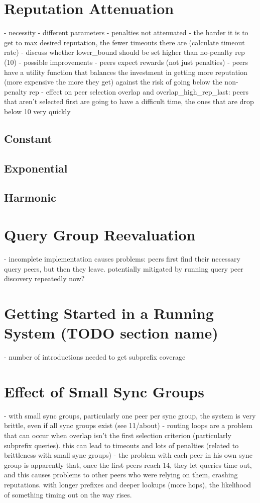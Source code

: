 \section{Reputation Attenuation}
- necessity
- different parameters
- penalties not attenuated
- the harder it is to get to max desired reputation, the fewer timeouts there
  are (calculate timeout rate)
- discuss whether lower\_bound should be set higher than no-penalty rep (10)
- possible improvements
    - peers expect rewards (not just penalties)
    - peers have a utility function that balances the investment in getting more
      reputation (more expensive the more they get) against the risk of going
      below the non-penalty rep
- effect on peer selection overlap and overlap\_high\_rep\_last: peers that
  aren't selected first are going to have a difficult time, the ones that are
  drop below 10 very quickly
\subsection{Constant}
\subsection{Exponential}
\subsection{Harmonic}

\section{Query Group Reevaluation}
- incomplete implementation causes problems: peers first find their necessary
  query peers, but then they leave. potentially mitigated by running query peer
  discovery repeatedly now?

\section{Getting Started in a Running System (TODO section name)}
- number of introductions needed to get subprefix coverage

\section{Effect of Small Sync Groups}
- with small sync groups, particularly one peer per sync group, the system is
  very brittle, even if all sync groups exist (see 11/about)
- routing loops are a problem that can occur when overlap isn't the first
  selection criterion (particularly subprefix queries). this can lead to
  timeouts and lots of penalties (related to brittleness with small sync groups)
- the problem with each peer in his own sync group is apparently that, once the
  first peers reach 14, they let queries time out, and this causes problems to
  other peers who were relying on them, crashing reputations. with longer
  prefixes and deeper lookups (more hops), the likelihood of something timing
  out on the way rises.


